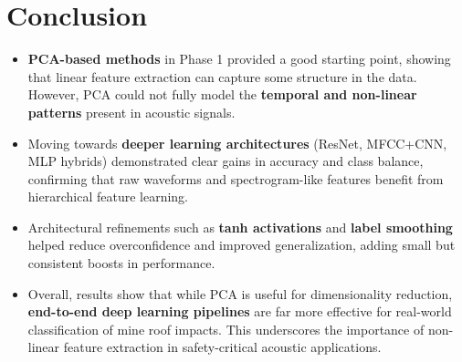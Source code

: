 \documentclass{article}
\begin{document}
\section{Conclusion}
\begin{itemize}
    \item \textbf{PCA-based methods} in Phase 1 provided a good starting point, showing that linear feature extraction can capture some structure in the data. However, PCA could not fully model the \textbf{temporal and non-linear patterns} present in acoustic signals.  
    \item Moving towards \textbf{deeper learning architectures} (ResNet, MFCC+CNN, MLP hybrids) demonstrated clear gains in accuracy and class balance, confirming that raw waveforms and spectrogram-like features benefit from hierarchical feature learning.  
    \item Architectural refinements such as \textbf{tanh activations} and \textbf{label smoothing} helped reduce overconfidence and improved generalization, adding small but consistent boosts in performance.  
    \item Overall, results show that while PCA is useful for dimensionality reduction, \textbf{end-to-end deep learning pipelines} are far more effective for real-world classification of mine roof impacts. This underscores the importance of non-linear feature extraction in safety-critical acoustic applications.  
\end{itemize}
\end{document}

